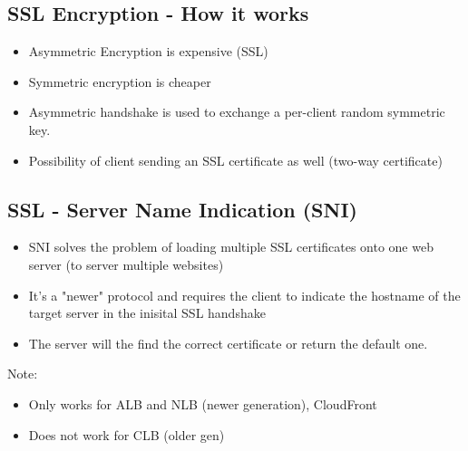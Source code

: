 \subsection{SSL Encryption - How it works}
\begin{itemize}
    \item Asymmetric Encryption is expensive (SSL)
    \item Symmetric encryption is cheaper
    \item Asymmetric handshake is used to exchange a per-client random symmetric key.
    \item Possibility of client sending an SSL certificate as well (two-way certificate)
\end{itemize}

\subsection{SSL - Server Name Indication (SNI)}
\begin{itemize}
    \item SNI solves the problem of loading multiple SSL certificates onto one web server (to server multiple websites)
    \item It's a "newer" protocol and requires the client to indicate the hostname of the target server in the inisital SSL handshake
    \item The server will the find the correct certificate or return the default one.
\end{itemize}

Note:
\begin{itemize}
    \item Only works for ALB and NLB (newer generation), CloudFront
    \item Does not work for CLB (older gen)
\end{itemize}

